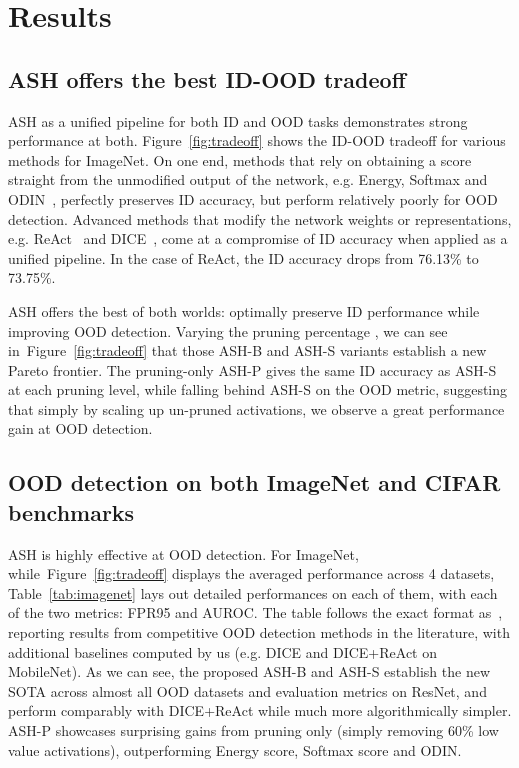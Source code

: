 \documentclass{article}
\newcommand{\figref}[1]{Figure~\ref{fig:#1}}
\newcommand{\seclabel}[1]{\label{sec:#1}}
\newcommand{\tabref}[1]{Table~\ref{tab:#1}}
\begin{document}
\section{Results}
\seclabel{ood}

\subsection{ASH offers the best ID-OOD tradeoff}
ASH as a unified pipeline for both ID and OOD tasks demonstrates strong performance at both. \figref{tradeoff} shows the ID-OOD tradeoff for various methods for ImageNet. On one end, methods that rely on obtaining a score straight from the unmodified output of the network, e.g. Energy, Softmax and ODIN~\citep{Liang2017}, perfectly preserves ID accuracy, but perform relatively poorly for OOD detection. Advanced methods that modify the network weights or representations, e.g. ReAct~\citep{react} and DICE~\citep{sun2022dice}, come at a compromise of ID accuracy when applied as a unified pipeline. In the case of ReAct, the ID accuracy drops from 76.13\% to 73.75\%.

ASH offers the best of both worlds: optimally preserve ID performance while improving OOD detection. Varying the pruning percentage , we can see in~\figref{tradeoff} that those ASH-B and ASH-S variants establish a new Pareto frontier. The pruning-only ASH-P gives the same ID accuracy as ASH-S at each pruning level, while falling behind ASH-S on the OOD metric, suggesting that simply by scaling up un-pruned activations, we observe a great performance gain at OOD detection. 


\subsection{OOD detection on both ImageNet and CIFAR benchmarks}

ASH is highly effective at OOD detection. For ImageNet, while~\figref{tradeoff} displays the averaged performance across 4 datasets, \tabref{imagenet} lays out detailed performances on each of them, with each of the two metrics: FPR95 and AUROC. The table follows the exact format as~\citet{react}, reporting results from competitive OOD detection methods in the literature, with additional baselines computed by us (e.g. DICE and DICE+ReAct on MobileNet). As we can see, the proposed ASH-B and ASH-S establish the new SOTA across almost all OOD datasets and evaluation metrics on ResNet, and perform comparably with DICE+ReAct while much more algorithmically simpler. ASH-P showcases surprising gains from pruning only (simply removing 60\% low value activations), outperforming Energy score, Softmax score and ODIN.
\end{document}
